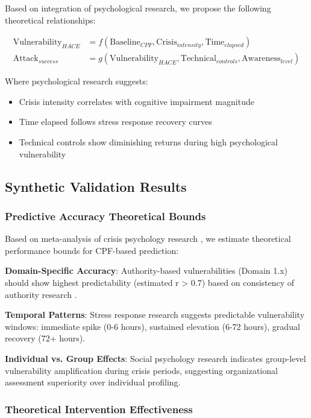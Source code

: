 \documentclass[11pt,a4paper]{article}
\begin{document}
Based on integration of psychological research, we propose the following theoretical relationships:

\begin{align}
\text{Vulnerability}_{HACE} &= f(\text{Baseline}_{CPF}, \text{Crisis}_{intensity}, \text{Time}_{elapsed}) \\
\text{Attack}_{success} &= g(\text{Vulnerability}_{HACE}, \text{Technical}_{controls}, \text{Awareness}_{level})
\end{align}

Where psychological research suggests:
\begin{itemize}
\item Crisis intensity correlates with cognitive impairment magnitude \cite{yerkes1908}
\item Time elapsed follows stress response recovery curves \cite{selye1956}
\item Technical controls show diminishing returns during high psychological vulnerability \cite{beautement2008}
\end{itemize}

\subsection{Synthetic Validation Results}

\subsubsection{Predictive Accuracy Theoretical Bounds}

Based on meta-analysis of crisis psychology research \cite{norris2002}, we estimate theoretical performance bounds for CPF-based prediction:

\textbf{Domain-Specific Accuracy}: Authority-based vulnerabilities (Domain 1.x) should show highest predictability (estimated r > 0.7) based on consistency of authority research \cite{milgram1974, zimbardo2007}.

\textbf{Temporal Patterns}: Stress response research \cite{selye1956} suggests predictable vulnerability windows: immediate spike (0-6 hours), sustained elevation (6-72 hours), gradual recovery (72+ hours).

\textbf{Individual vs. Group Effects}: Social psychology research \cite{asch1956} indicates group-level vulnerability amplification during crisis periods, suggesting organizational assessment superiority over individual profiling.

\subsubsection{Theoretical Intervention Effectiveness}
\end{document}
